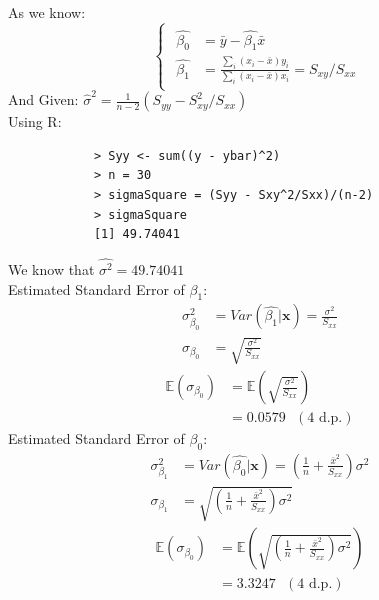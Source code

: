 \documentclass[a4paper]{article}
\begin{document}
	\subsection{}
		As we know:
		\[\begin{cases}
			\begin{split}
				\hat{\beta_0} &= \bar{y} - \hat{\beta_1}\bar{x}\\
				\hat{\beta_1} &= \frac{\sum_i (x_i - \bar{x})y_i}{\sum_i (x_i - \bar{x})x_i} = S_{xy}/S_{xx}
			\end{split}
		\end{cases}\]
		And Given: \(\hat{\sigma}^2 = \frac{1}{n-2}(S_{yy}-S_{xy}^2/S_{xx})\)\\
		Using R:
		\begin{verbatim}
			> Syy <- sum((y - ybar)^2)
			> n = 30
			> sigmaSquare = (Syy - Sxy^2/Sxx)/(n-2)
			> sigmaSquare
			[1] 49.74041
		\end{verbatim}
		We know that \(\hat{\sigma^2} = 49.74041\)\\
		Estimated Standard Error of \(\beta_1\):
			\begin{equation*}
				\begin{split}
					\sigma_{\beta_0}^2 &= Var(\hat{\beta_1}|\textbf{x}) = \frac{\sigma^2}{S_{xx}}\\
					\sigma_{\beta_0} &= \sqrt{\frac{\sigma^2}{S_{xx}}}
				\end{split}
			\end{equation*}
			\begin{equation*}
				\begin{split}
					\mathbb{E}(\sigma_{\beta_0}) &= \mathbb{E}\left(\sqrt{\frac{\sigma^2}{S_{xx}}}\right)\\
					&= 0.0579 \text{ }(4 \text{ d.p.})
				\end{split}
			\end{equation*}
		Estimated Standard Error of \(\beta_0\):
		\begin{equation*}
			\begin{split}
				\sigma_{\beta_1}^2 &= Var(\hat{\beta_0}|\textbf{x}) = \left(\frac{1}{n}+\frac{\bar{x}^2}{S_{xx}}\right)\sigma^2\\
				\sigma_{\beta_1} &= \sqrt{\left(\frac{1}{n}+\frac{\bar{x}^2}{S_{xx}}\right)\sigma^2}
			\end{split}
		\end{equation*}
		\begin{equation*}
			\begin{split}
				\mathbb{E}(\sigma_{\beta_0}) &= \mathbb{E}\left(\sqrt{\left(\frac{1}{n}+\frac{\bar{x}^2}{S_{xx}}\right)\sigma^2}\right)\\
				&= 3.3247 \text{ }(4 \text{ d.p.})
			\end{split}
		\end{equation*}
\end{document}
